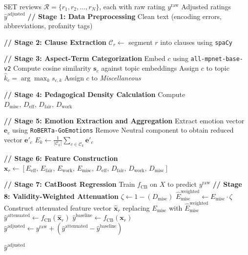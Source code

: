 \documentclass{article}
\begin{document}
\thispagestyle{empty}
\begin{algorithm}[H]
\caption{Validity-Weighted Attenuation Framework}
\begin{algorithmic}[1]
\Require SET reviews $\mathcal{R} = \{r_1, r_2, \ldots, r_N\}$, each with raw rating $y^{\text{raw}}$ \Ensure Adjusted ratings $\hat{y}^{\text{adjusted}}$ 
\State \textbf{// Stage 1: Data Preprocessing}
    \State Clean text (encoding errors, abbreviations, profanity tags)
\EndFor

\State \textbf{// Stage 2: Clause Extraction}
    \State $\mathcal{C}_r \leftarrow$ segment $r$ into clauses using \texttt{spaCy}
\EndFor

\State \textbf{// Stage 3: Aspect-Term Categorization}
    \State Embed $c$ using \texttt{all-mpnet-base-v2}
    \State Compute cosine similarity $\mathbf{s}_c$ against topic embeddings
        \State Assign $c$ to topic $\hat{k}_c = \arg\max_k s_{c,k}$     \Else
        \State Assign $c$ to \textit{Miscellaneous}
    \EndIf
\EndFor

\State \textbf{// Stage 4: Pedagogical Density Calculation}
    \State Compute $D_{\text{misc}},\, D_{\text{eff}},\, D_{\text{fair}},\, D_{\text{work}}$ \EndFor

\State \textbf{// Stage 5: Emotion Extraction and Aggregation}
    \State Extract emotion vector $\mathbf{e}_c$ using \texttt{RoBERTa-GoEmotions}
    \State Remove Neutral component to obtain reduced vector $\mathbf{e}'_c$ 
\EndFor
{}
    \State $E_k \leftarrow \frac{1}{|\mathcal{C}_k|} \sum_{c \in \mathcal{C}_k} \mathbf{e}'_c$ \EndFor

\State \textbf{// Stage 6: Feature Construction}
    \State $\mathbf{x}_r \leftarrow [E_{\text{eff}},\, E_{\text{fair}},\, E_{\text{work}},\, E_{\text{misc}},\, D_{\text{eff}},\, D_{\text{fair}},\, D_{\text{work}},\, D_{\text{misc}}]$ \EndFor

\State \textbf{// Stage 7: CatBoost Regression}
\State Train $f_{\text{CB}}$ on $X$ to predict $y^{\text{raw}}$ 
\State \textbf{// Stage 8: Validity-Weighted Attenuation}
    \State $\zeta \leftarrow 1 - (D_{\text{misc}})$     \State $\hat{E}^{\text{weighted}}_{\text{misc}} \leftarrow E_{\text{misc}} \cdot \zeta$     \State Construct attenuated feature vector $\hat{\mathbf{x}}_r$ replacing $E_{\text{misc}}$ with $\hat{E}^{\text{weighted}}_{\text{misc}}$ 
    \State $\hat{y}^{\text{attenuated}} \leftarrow f_{\text{CB}}(\hat{\mathbf{x}}_r)$     \State $\hat{y}^{\text{baseline}} \leftarrow f_{\text{CB}}(\mathbf{x}_r)$     \State $\hat{y}^{\text{adjusted}} \leftarrow y^{\text{raw}} + (\hat{y}^{\text{attenuated}} - \hat{y}^{\text{baseline}})$ \EndFor

\State \Return $\hat{y}^{\text{adjusted}}$ \end{algorithmic}
\end{algorithm}
\end{document}
